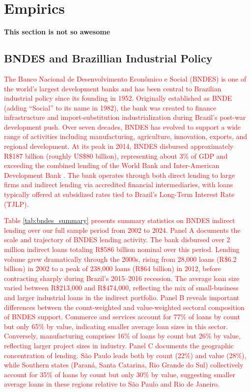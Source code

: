 \documentclass{article}
\begin{document}
\section{Empirics}\label{sec:data}

\textbf{This section is not so awesome}

\subsection{BNDES and Brazillian Industrial Policy}

\textcolor{red}{The Banco Nacional de Desenvolvimento Econ\^omico e Social (BNDES) is one of the world's largest development banks and has been central to Brazilian industrial policy since its founding in 1952. Originally established as BNDE (adding ``Social'' to its name in 1982), the bank was created to finance infrastructure and import-substitution industrialization during Brazil's post-war development push. Over seven decades, BNDES has evolved to support a wide range of activities including manufacturing, agriculture, innovation, exports, and regional development. At its peak in 2014, BNDES disbursed approximately R\$187 billion (roughly US\$80 billion), representing about 3\% of GDP and exceeding the combined lending of the World Bank and Inter-American Development Bank \citep{lazzarini2015state}. The bank operates through both direct lending to large firms and indirect lending via accredited financial intermediaries, with loans typically offered at subsidized rates tied to Brazil's Long-Term Interest Rate (TJLP).}

\textcolor{red}{Table \ref{tab:bndes_summary} presents summary statistics on BNDES indirect lending over our full sample period from 2002 to 2024. Panel A documents the scale and trajectory of BNDES lending activity. The bank disbursed over 2 million indirect loans totaling R\$586 billion nominal over this period. Lending volume grew dramatically through the 2000s, rising from 28,000 loans (R\$6.2 billion) in 2002 to a peak of 238,000 loans (R\$64 billion) in 2012, before contracting sharply during Brazil's 2015--2016 recession. The average loan size varied between R\$213,000 and R\$474,000, reflecting the mix of small-business and larger industrial loans in the indirect portfolio. Panel B reveals important differences between the count-weighted and value-weighted sectoral composition of BNDES support. Commerce and services account for 77\% of loans by count but only 65\% by value, indicating smaller average loan sizes in this sector. Conversely, manufacturing comprises 16\% of loans by count but 26\% by value, reflecting larger project sizes in industry. Panel C documents the geographic concentration of lending. S\~ao Paulo leads both by count (22\%) and value (28\%), while Southern states (Paran\'a, Santa Catarina, Rio Grande do Sul) collectively account for 35\% of loans by count but only 30\% by value, suggesting smaller average loans in these regions relative to S\~ao Paulo and Rio de Janeiro.}
\end{document}
